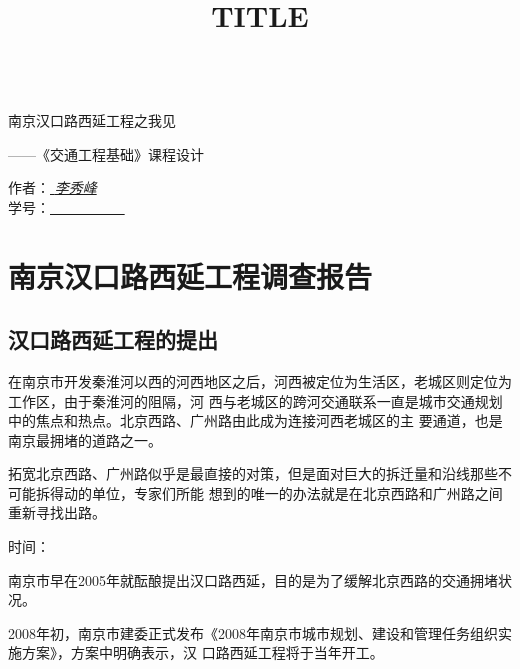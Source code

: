 ﻿\documentclass[11pt,a4paper,onecolumn]{article}
\title{TITLE}
\author{}
\date{}
\begin{document}
\thispagestyle{empty}
\begin{center}
\textsf{\Huge{\\[10ex]南京汉口路西延工程之我见} }
\end{center}

\begin{flushright}
    \large{——《交通工程基础》课程设计}
\end{flushright}



\begin{center}
\begin{minipage}{0.3\linewidth}
\vspace{12ex}
\begin{large}
作者：\underline{ \textit{李秀峰} }
\\[3ex]学号：\underline{ ~~~~~~~~~~ }
\end{large}
\end{minipage}
\end{center}



\pagebreak

\setcounter{page}{1}
\pagestyle{plain}
\tableofcontents

\listoffigures

\pagebreak
\setcounter{page}{1}
\pagestyle{fancy}

\section{南京汉口路西延工程调查报告}

\subsection{汉口路西延工程的提出}

在南京市开发秦淮河以西的河西地区之后，河西被定位为生活区，老城区则定位为工作区，由于秦淮河的阻隔，河
西与老城区的跨河交通联系一直是城市交通规划中的焦点和热点。北京西路、广州路由此成为连接河西老城区的主
要通道，也是南京最拥堵的道路之一。

拓宽北京西路、广州路似乎是最直接的对策，但是面对巨大的拆迁量和沿线那些不可能拆得动的单位，专家们所能
想到的唯一的办法就是在北京西路和广州路之间重新寻找出路。

时间：

南京市早在2005年就酝酿提出汉口路西延，目的是为了缓解北京西路的交通拥堵状况。

2008年初，南京市建委正式发布《2008年南京市城市规划、建设和管理任务组织实施方案》，方案中明确表示，汉
口路西延工程将于当年开工。
\end{document}
